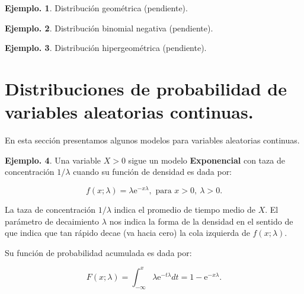 \documentclass[]{book}
\theoremstyle{definition}
\theoremstyle{definition}
\newtheorem{example}{Ejemplo.}[chapter]
\theoremstyle{definition}
\theoremstyle{remark}
\begin{document}
\begin{example}
\protect\hypertarget{exm:unnamed-chunk-144}{}{\label{exm:unnamed-chunk-144} }
Distribución geométrica (pendiente).
\end{example}

\begin{example}
\protect\hypertarget{exm:unnamed-chunk-145}{}{\label{exm:unnamed-chunk-145} }
Distribución binomial negativa (pendiente).
\end{example}

\begin{example}
\protect\hypertarget{exm:unnamed-chunk-146}{}{\label{exm:unnamed-chunk-146} }
Distribución hipergeométrica (pendiente).
\end{example}

\hypertarget{distribuciones-de-probabilidad-de-variables-aleatorias-continuas.}{%
\section{Distribuciones de probabilidad de variables aleatorias continuas.}\label{distribuciones-de-probabilidad-de-variables-aleatorias-continuas.}}

En esta sección presentamos algunos modelos para variables
aleatorias continuas.

\begin{example}
\protect\hypertarget{exm:unnamed-chunk-147}{}{\label{exm:unnamed-chunk-147} }
Una variable \(X>0\) sigue un modelo \textbf{Exponencial} con taza de
concentración \(1/\lambda\) cuando su función de densidad es dada
por:

\[ f(x;\lambda)= \lambda \mbox{e}^{-x\lambda}, \mbox{ para }
     x>0,\ \lambda>0.     \]

La taza de concentración \(1/\lambda\) indica el promedio de tiempo
medio de \(X\). El parámetro de decaimiento \(\lambda\) nos indica la
forma de la densidad en el sentido de que indica que tan rápido decae
(va hacia cero) la cola izquierda de \(f(x;\lambda)\).

Su función de probabilidad acumulada es dada por:

\[F(x;\lambda)= \int_{-\infty}^{x} \lambda \mbox{e}^{-t\lambda}dt=
    1- \mbox{e}^{-x\lambda}.   \]
\end{example}
\end{document}
